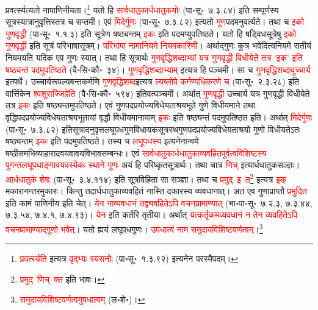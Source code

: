 \begin{sloppypar}
प्रवर्त्स्यत्यतो नापाणिनीयता।\footnote{\textcolor{red}{प्रवर्त्स्यति} इत्यत्र \textcolor{red}{वृद्भ्यः स्यसनोः} (पा॰सू॰~१.३.९२) इत्यनेन परस्मैपदम्।} यतो हि \textcolor{red}{सार्वधातुकार्ध\-धातुकयोः} (पा॰सू॰~७.३.८४) इति सम्पूर्णस्य सूत्रस्यात्रानुवृत्तिस्तत्र च सप्तमी। एवं \textcolor{red}{मिदेर्गुणः} (पा॰सू॰~७.३.८२) इत्यतो \textcolor{red}{गुण}\-पदमनुवर्त्यते। तथा च \textcolor{red}{इको गुण\-वृद्धी} (पा॰सू॰~१.१.३) इति सूत्रेण षष्ठ्यन्तम् \textcolor{red}{इकः} इति पदमप्युपतिष्ठते। यतो हि षड्विध\-सूत्रेषु \textcolor{red}{इको गुण\-वृद्धी} इति सूत्रं परिभाषा\-सूत्रम्। \textcolor{red}{परिभाषा नामानियमे नियमकारिणी}। अर्थाद्गुणः कुत्र भवेदित्यनियमे सतीयं नियमयति यदिक एव गुणः स्यात्। तथा हि सूत्रार्थः \textcolor{red}{गुण\-वृद्धि\-शब्दाभ्यां यत्र गुण\-वृद्धी विधीयेते तत्र ‘इक’ इति षष्ठ्यन्तं पदमुपतिष्ठते} (वै॰सि॰कौ॰~३४)। \textcolor{red}{गुण\-वृद्धि\-शब्दाभ्याम्} इत्यत्र हि पञ्चमी। सा च \textcolor{red}{गुण\-वृद्धि\-शब्दावुच्चार्य} इत्यर्थे। उच्चार्य\-रूप\-ल्यबन्त\-कर्मणि \textcolor{red}{गुण\-वृद्धि\-शब्द}\-इत्यत्र \textcolor{red}{ल्यब्लोपे कर्मण्यधिकरणे च} (पा॰सू॰~२.३.२८) इति वार्त्तिकेन \textcolor{red}{श्वशुराज्जिह्रेति} (वै॰सि॰कौ॰~५९४) इतिवत्पञ्चमी। अर्थात् \textcolor{red}{गुण\-वृद्धी} उच्चार्य यत्र गुण\-वृद्धी विधीयेते तत्र \textcolor{red}{इकः} इति षष्ठ्यन्तमुपतिष्ठते। एवं गुण\-पद\-प्रयोज्य\-विधेयताश्रय\-भूते गुणे विधीयमाने तथा वृद्धि\-पद\-प्रयोज्य\-विधेयताश्रय\-भूतायां वृद्धौ विधीयमानायाम् \textcolor{red}{इकः} इति षष्ठ्यन्तं पदमुपतिष्ठत इति। अर्थात् \textcolor{red}{मिदेर्गुणः} (पा॰सू॰~७.३.८२) इति\-सूत्रादनुवृत्त\-लघूपध\-गुण\-विधायक\-सूत्रस्थ\-गुण\-पद\-प्रयोज्य\-विधेयताश्रयो गुणो विधीयतेऽतः षष्ठ्यन्तम् \textcolor{red}{इकः} इति पदमुपतिष्ठते। तस्य च \textcolor{red}{लघूपधस्य} इत्यनेनान्वये षष्ठी\-समभिव्याहारादवयवावयवि\-भाव\-सम्बन्धः। एवं \textcolor{red}{सार्वधातुकार्धधातुकाव्यवहित\-पूर्वत्व\-विशिष्टस्य पुगन्त\-लघूपधाङ्गावयवस्येकः स्थाने गुणः} अयं हि परिष्कृत\-सूत्रार्थः। तथा चात्र \textcolor{red}{णिच्} इत्यार्धधातुक\-सञ्ज्ञः। \textcolor{red}{आर्धधातुकं शेषः} (पा॰सू॰~३.४.११४) इति सूत्रविहिता सा सञ्ज्ञा। तथा च \textcolor{red}{प्रमुद्~इ~त}\footnote{\textcolor{red}{प्रमुद्~णिच्~क्त} इति भावः।} इत्यत्र \textcolor{red}{इक्} मकारानन्तरमुकारः। किन्तु तदार्धधातुकाव्यवहितं नास्ति दकारस्य व्यवधानात्। अत एव गुणाप्राप्तौ \textcolor{red}{प्रमुदित} इति कामं पाणिनीय इति चेत्। \textcolor{red}{येन नाव्यवधानं तद्व्यवहितेऽपि वचन\-प्रामाण्यात्} (भा॰पा॰सू॰~७.२.३, ७.३.४४, ७.३.५४, ७.४.१, ७.४.९३)। \textcolor{red}{येन} इति कर्तरि तृतीया। अर्थात् \textcolor{red}{यत्कर्तृकमव्यवधानं न तेन व्यवहितेऽपि वचन\-प्रामाण्याद्गुणो भवेत्}। यतो ह्ययं लघूपध\-गुणः।
\textcolor{red}{उपधात्वं नाम समुदाय\-विशिष्टवर्णत्वम्}।\footnote{\textcolor{red}{समुदाय\-विशिष्ट\-वर्णत्वमुपधात्वम्} (ल॰शे॰)।}

\end{sloppypar}
